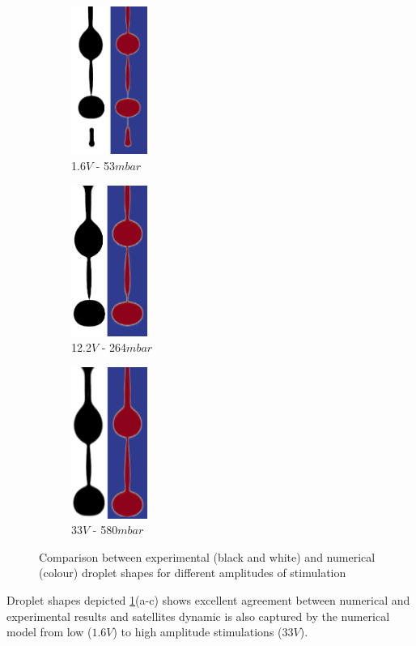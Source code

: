 \documentclass[twocolumn,10pt]{asme2ej}
\begin{document}
\begin{figure}[h]
    \centering
    \begin{subfigure}{2.7cm}
        \centering
        \includegraphics[width=2.5cm]{Glycerol/num_exp_053mbar_1.png}
        \caption{1.6$V$ - 53$mbar$}
    \end{subfigure}
    \hfill
    \begin{subfigure}{2.7cm}
        \centering
        \includegraphics[width=2.5cm]{Glycerol/num_exp_264mbar.png}
        \caption{12.2$V$ - 264$mbar$}
    \end{subfigure}
    \hfill
    \begin{subfigure}{2.7cm}
        \centering
        \includegraphics[width=2.5cm]{Glycerol/num_exp_580mbar_1.png}
        \caption{33$V$ - 580$mbar$}
    \end{subfigure}
       \caption{Comparison between experimental (black and white) and numerical (colour) droplet shapes for different amplitudes of stimulation}
       \label{fig:glycerolDrop}
\end{figure}
Droplet shapes depicted \ref{fig:glycerolDrop}(a-c) shows excellent agreement between numerical and experimental results and satellites dynamic is also captured by the numerical model from low ($1.6V$) to high amplitude stimulations ($33V$).
\end{document}
